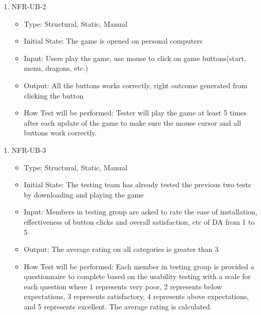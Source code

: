 \documentclass[12,english]{article}
\begin{document}
\begin{enumerate}
    \item NFR-UB-2
    \begin{itemize}
        \item Type: Structural, Static, Manual
        \item Initial State: The game is opened on personal computers
        \item Input: Users play the game, use mouse to click on game buttons(start, menu, dragons, etc.)
        \item Output: All the buttons works correctly, right outcome generated from clicking the button
        \item How Test will be performed: Tester will play the game at least 5 times after each update of the game to make sure the mouse cursor and all buttons work correctly.
    \end{itemize}
\end{enumerate}

\begin{enumerate}
    \item NFR-UB-3
    \begin{itemize}
        \item Type: Structural, Static, Manual
        \item Initial State: The testing team has already tested the previous two tests by downloading and playing the game
        \item Input: Members in testing group are asked to rate the ease of installation, effectiveness of button clicks and overall satisfaction, etc of DA from 1 to 5
        \item Output: The average rating on all categories is greater than 3
        \item How Test will be performed: Each member in testing group is provided a questionnaire to complete based on the usability testing with a scale for each question where 1 represents very poor, 2 represents below expectations, 3 represents satisfactory, 4 represents above expectations, and 5 represents excellent. The average rating is calculated. 
    \end{itemize}
\end{enumerate}
\end{document}
